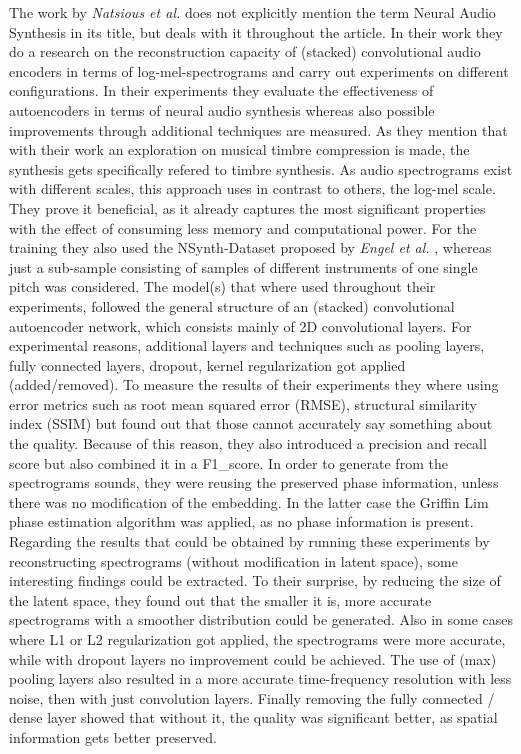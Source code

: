 The work by \textit{Natsious et al.} does not explicitly mention the term Neural Audio Synthesis in its title, but deals with it throughout the article. \cite{Natsiou2023} In their work they do a research on the reconstruction capacity of (stacked) convolutional audio encoders in terms of log-mel-spectrograms and carry out experiments on different configurations. In their experiments they evaluate the effectiveness of autoencoders in terms of neural audio synthesis whereas also possible improvements through additional techniques are measured. As they mention that with their work an exploration on musical timbre compression is made, the synthesis gets specifically refered to timbre synthesis. As audio spectrograms exist with different scales, this approach uses in contrast to others, the log-mel scale. They prove it beneficial, as it already captures the most significant properties with the effect of consuming less memory and computational power. For the training they also used the NSynth-Dataset proposed by \textit{Engel et al. } \cite{Engel2017}, whereas just a sub-sample consisting of samples of different instruments of one single pitch was considered. The model(s) that where used throughout their experiments, followed the general structure of an (stacked) convolutional autoencoder network, which consists mainly of 2D convolutional layers. For experimental reasons, additional layers and techniques such as pooling layers, fully connected layers, dropout, kernel regularization got applied (added/removed). To measure the results of their experiments they where using error metrics such as root mean squared error (RMSE), structural similarity index (SSIM) but found out that those cannot accurately say something about the quality. Because of this reason, they also introduced a precision and recall score but also combined it in a F1\_score. In order to generate from the spectrograms sounds, they were reusing the preserved phase information, unless there was no modification of the embedding. In the latter case the Griffin Lim phase estimation algorithm was applied, as no phase information is present.\\
Regarding the results that could be obtained by running these experiments by reconstructing spectrograms (without modification in latent space), some interesting findings could be extracted. To their surprise, by reducing the size of the latent space, they found out that the smaller it is, more accurate spectrograms with a smoother distribution could be generated. Also in some cases where L1 or L2 regularization got applied, the spectrograms were more accurate, while with dropout layers no improvement could be achieved. The use of (max) pooling layers also resulted in a more accurate time-frequency resolution with less noise, then with just convolution layers. Finally removing the fully connected / dense layer showed that without it, the quality was significant better, as spatial information gets better preserved.\\

